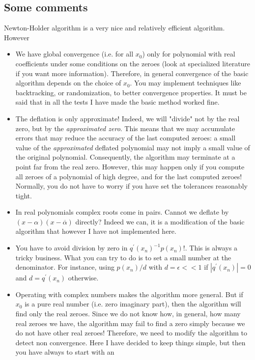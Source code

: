 \documentclass[10pt,a4paper]{article}
\theoremstyle{definition}%
\begin{document}
\subsection{Some comments}
Newton-Holder algorithm is a very nice and relatively efficient algorithm. However
\begin{itemize}
    \item We have global convergence (i.e. for all $x_0$) only for polynomial with real coefficients under some conditions on the zeroes (look at specialized literature if you want more information). Therefore, in general convergence of the basic algorithm depends on the choice of $x_0$. You may implement techniques like backtracking, or randomization, to better convergence properties. It must be said that in all the tests I have made the basic method worked fine.
    \item The deflation is only approximate! Indeed, we will "divide" not by the real zero, but by the \emph{approximated zero}. This means that we may accumulate errors that may reduce the accuracy of the last computed zeroes: a small value of the \emph{approximated} deflated polynomial may not imply a small value of the original polynomial. Consequently, the algorithm may terminate at a point far from the real zero. 
    However, this may happen only if you compute all zeroes of a polynomial of high degree, and for the last computed zeroes! Normally, you do not have to worry if you have set the tolerances reasonably tight. 
    \item In real polynomials complex roots come in pairs. Cannot we deflate by $(x-\alpha)(x-\overline{\alpha})$ directly? Indeed we can, it is a modification of the basic algorithm that however I have not implemented here.  
    \item You have to avoid division by zero in   $q^\prime(x_n)^{-1}p(x_n)$!. This is always a tricky business. What you can try to do is 
    to set a small number at the denominator. For instance, using $p(x_n)/d$ with $d=\epsilon<<1$ if $|q^\prime(x_n)|=0$ and $d=q^\prime(x_n)$ otherwise. 
    \item Operating with complex numbers makes the algorithm more general. But if $x_0$ is a pure real number (i.e. zero imaginary part), then the algorithm will find only the real zeroes. Since we do not know how, in general, how many real zeroes we have, the algorithm may fail to find a zero simply because we do not have other real zeroes! Therefore, we need to modify the algorithm to detect non convergence. Here I have decided to keep things simple, but then you have always to start with an 

\end{itemize}
\end{document}
